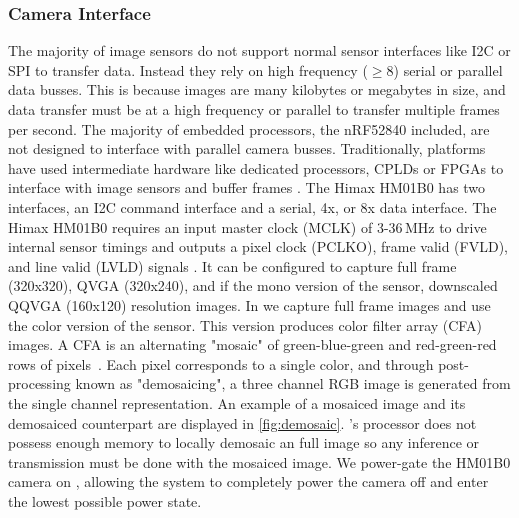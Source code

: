 \subsubsection{Camera Interface}
The majority of image sensors do not support normal sensor interfaces like I2C or SPI to transfer data. Instead they rely on high frequency ($\geq$8\ssi{\mega\hertz}) serial or parallel data busses. This is because images are many kilobytes or megabytes in size, and data transfer must be at a high frequency or parallel to transfer multiple frames per second. The majority of embedded processors, the nRF52840 included, are not designed to interface with parallel camera busses. Traditionally, platforms have used intermediate hardware like dedicated processors, CPLDs or FPGAs to interface with image sensors and buffer frames \cite{rowe2007firefly,rahimi2005cyclops}. The Himax HM01B0 has two interfaces, an I2C command interface and a serial, 4x, or 8x data interface.
The Himax HM01B0 requires an input master clock (MCLK) of 3-36\,MHz to drive internal sensor timings and outputs a pixel clock (PCLKO), frame valid (FVLD), and line valid (LVLD) signals \cite{hm01b0}. It can be configured to capture full frame (320x320), QVGA (320x240), and if the mono version of the sensor, downscaled QQVGA (160x120) resolution images. In \namec{} we capture full frame images and use the color version of the sensor. 
This version produces color filter array (CFA) images. 
A CFA is an alternating "mosaic" of green-blue-green and red-green-red rows of pixels~\cite{bayer1976color}. 
Each pixel corresponds to a single color, and through post-processing known as "demosaicing", a three channel RGB image is generated from the single channel representation. 
An example of a mosaiced image and its demosaiced counterpart are displayed in \cref{fig:demosaic}.
\namec{}'s processor does not possess enough memory to locally demosaic an full image so any inference or transmission must be done with the mosaiced image. 
We power-gate the HM01B0 camera on \namec, allowing the system to completely power the camera off and enter the lowest possible power state.


